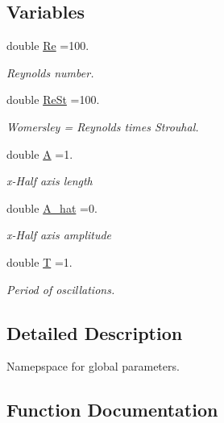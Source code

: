 \subsection*{Variables}
\begin{DoxyCompactItemize}
\item 
double \hyperlink{namespaceGlobal__Physical__Variables_ab814e627d2eb5bc50318879d19ab16b9}{Re} =100.
\begin{DoxyCompactList}\small\item\em Reynolds number. \end{DoxyCompactList}\item 
double \hyperlink{namespaceGlobal__Physical__Variables_a085ee4bf968ffdd01a41b8c41864f907}{Re\+St} =100.
\begin{DoxyCompactList}\small\item\em Womersley = Reynolds times Strouhal. \end{DoxyCompactList}\item 
double \hyperlink{namespaceGlobal__Physical__Variables_a4894f9a3a9cbf84f00d0719f2841e624}{A} =1.
\begin{DoxyCompactList}\small\item\em x-\/\+Half axis length \end{DoxyCompactList}\item 
double \hyperlink{namespaceGlobal__Physical__Variables_a11d1e77201d6b8c250c4c9396fc5ad06}{A\+\_\+hat} =0.
\begin{DoxyCompactList}\small\item\em x-\/\+Half axis amplitude \end{DoxyCompactList}\item 
double \hyperlink{namespaceGlobal__Physical__Variables_a1a806ee7c4d04d6afaba1d24d94dceea}{T} =1.
\begin{DoxyCompactList}\small\item\em Period of oscillations. \end{DoxyCompactList}\end{DoxyCompactItemize}


\subsection{Detailed Description}
Namepspace for global parameters. 

\subsection{Function Documentation}
\mbox{\label{namespaceGlobal__Physical__Variables_af29d0fbf7264555610176a1fc931591a}} 
